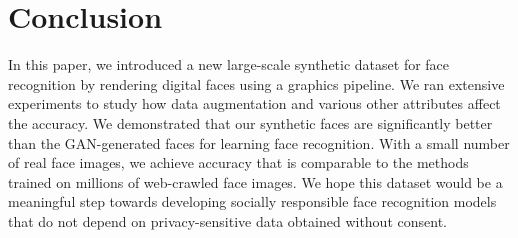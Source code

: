 \documentclass[10pt,twocolumn,letterpaper]{article}
\begin{document}
\section{Conclusion}

In this paper, we introduced a new large-scale synthetic dataset for face recognition by rendering digital faces using a graphics pipeline. 
We ran extensive experiments to study how data augmentation and various other attributes affect the accuracy. 
We demonstrated that our synthetic faces are significantly better than the GAN-generated faces for learning face recognition. 
With a small number of real face images, we achieve accuracy that is comparable to the methods trained on millions of web-crawled face images. 
We hope this dataset would be a meaningful step towards developing socially responsible face recognition models that do not depend on privacy-sensitive data obtained without consent.


{\small


}
\end{document}
